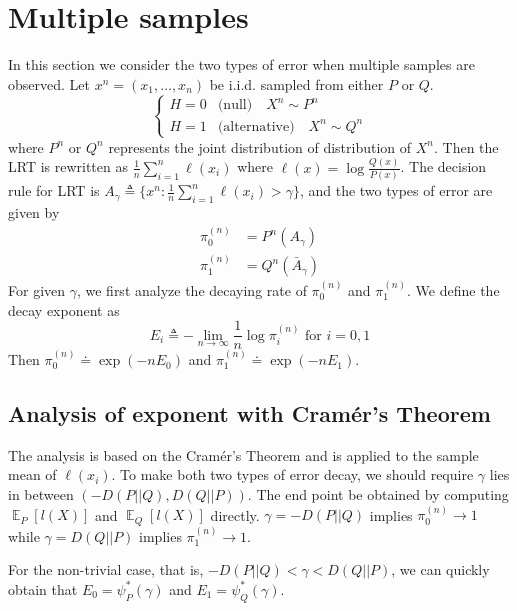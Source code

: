 \documentclass{article}
\DeclareMathOperator{\E}{\mathbb{E}}
\begin{document}
\section{Multiple samples}
In this section we consider the two types of error
when multiple samples are observed.
Let $x^n = (x_1, \dots, x_n)$ be i.i.d. sampled from either
$P$ or $Q$.
\begin{equation}
    \begin{cases}
    H=0 & \textrm{(null)} \quad X^n \sim P^n \\
    H=1 & \textrm{(alternative)} \quad X^n \sim Q^n
    \end{cases}
\end{equation}
where $P^n$ or $Q^n$ represents the joint distribution of distribution of $X^n$. Then the LRT is rewritten
as $\frac{1}{n}\sum_{i=1}^n \ell(x_i)$ where
$\ell(x)=\log \frac{Q(x)}{P(x)}$. The decision rule for LRT
is $A_{\gamma} \triangleq \{
x^n: \frac{1}{n}\sum_{i=1}^n \ell(x_i) > \gamma
\}$,
and the two types of error are given by
\begin{align*}
    \pi_0^{(n)} &= P^n(A_{\gamma}) \\
    \pi_1^{(n)} &= Q^n(\bar{A}_{\gamma})
\end{align*}
For given $\gamma$, we first analyze the decaying
rate of $\pi_0^{(n)}$ and $\pi_1^{(n)}$.
We define the decay exponent as
\begin{equation}
    E_i \triangleq -\lim_{n\to \infty} \frac{1}{n}
    \log \pi_i^{(n)}\textrm{ for } i=0,1
\end{equation}
Then $\pi_0^{(n)} \doteq \exp(-n E_0)$
and $\pi_1^{(n)} \doteq \exp(-n E_1)$.
\subsection{Analysis of exponent with Cramér's Theorem}
The analysis is based on the Cramér's Theorem
and is applied to the sample mean of $\ell(x_i)$.
To make both two types of error decay, we should require
$\gamma$ lies in between $(-D(P||Q), D(Q||P))$. The end point
be obtained by computing $\E_P[l(X)]$ and $\E_Q[l(X)]$ directly. $\gamma = -D(P||Q)$ implies $\pi_0^{(n)}\to 1$
while $\gamma = D(Q||P)$ implies $\pi_1^{(n)}\to 1$.

For the non-trivial case, that is, $-D(P||Q) < \gamma < D(Q||P)$, we can quickly obtain that
$E_0 = \psi^*_P(\gamma)$ and $E_1 = \psi^*_Q(\gamma)$.
\end{document}
